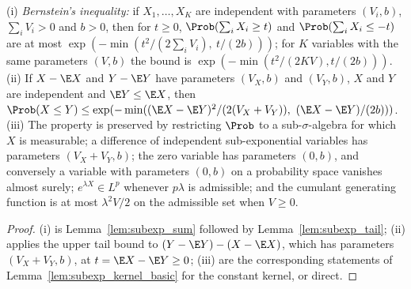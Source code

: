 \begin{lemma}\label{lem:subexp_measure_more}
\leanok
{}
(i) \emph{Bernstein's inequality:} if $X_1,\dots,X_K$ are independent with parameters
$(V_i, b)$, $\sum_iV_i > 0$ and $b > 0$, then for $t \ge 0$, $\Prob(\sum_iX_i \ge t)$ and
$\Prob(\sum_iX_i \le -t)$ are at most $\exp(-\min(t^2/(2\sum_iV_i),\ t/(2b)))$; for $K$
variables with the same parameters $(V, b)$ the bound is $\exp(-\min(t^2/(2KV), t/(2b)))$.
(ii) If $X - \E X$ and $Y - \E Y$ have parameters $(V_X, b)$ and $(V_Y, b)$, $X$ and $Y$ are
independent and $\E Y \le \E X$, then
$\Prob(X \le Y) \le \exp(-\min((\E X - \E Y)^2/(2(V_X+V_Y)),\ (\E X - \E Y)/(2b)))$.
(iii) The property is preserved by restricting $\Prob$ to a sub-$\sigma$-algebra for which
$X$ is measurable; a difference of independent sub-exponential variables has parameters
$(V_X + V_Y, b)$; the zero variable has parameters $(0, b)$, and conversely a variable with
parameters $(0, b)$ on a probability space vanishes almost surely; $e^{\lambda X} \in L^p$
whenever $p\lambda$ is admissible; and the cumulant generating function is at most
$\lambda^2V/2$ on the admissible set when $V \ge 0$.
\end{lemma}

\begin{proof}
\leanok
{}
(i) is Lemma~\ref{lem:subexp_sum} followed by Lemma~\ref{lem:subexp_tail}; (ii) applies the
upper tail bound to $(Y - \E Y) - (X - \E X)$, which has parameters $(V_X + V_Y, b)$, at
$t = \E X - \E Y \ge 0$; (iii) are the corresponding statements of
Lemma~\ref{lem:subexp_kernel_basic} for the constant kernel, or direct.
\end{proof}

